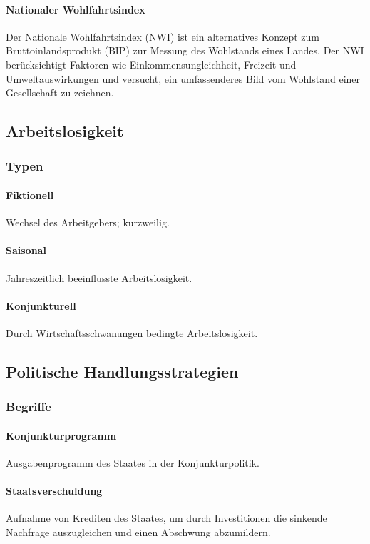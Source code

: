 \documentclass{article}
\begin{document}
	\paragraph{Nationaler Wohlfahrtsindex}
	Der Nationale Wohlfahrtsindex (NWI) ist ein alternatives Konzept zum Bruttoinlandsprodukt (BIP) zur Messung des Wohlstands eines Landes. Der NWI berücksichtigt Faktoren wie Einkommensungleichheit, Freizeit und Umweltauswirkungen und versucht, ein umfassenderes Bild vom Wohlstand einer Gesellschaft zu zeichnen.

	\subsection{Arbeitslosigkeit}
	\subsubsection{Typen}

	\paragraph{Fiktionell}
	Wechsel des Arbeitgebers; kurzweilig.

	\paragraph{Saisonal}
	Jahreszeitlich beeinflusste Arbeitslosigkeit.

	\paragraph{Konjunkturell}
	Durch Wirtschaftsschwanungen bedingte Arbeitslosigkeit.

	\subsection{Politische Handlungsstrategien}
	\subsubsection{Begriffe}

	\paragraph{Konjunkturprogramm}
	Ausgabenprogramm des Staates in der Konjunkturpolitik.

	\paragraph{Staatsverschuldung}
	Aufnahme von Krediten des Staates, um durch Investitionen die sinkende Nachfrage auszugleichen und einen Abschwung abzumildern.
\end{document}
